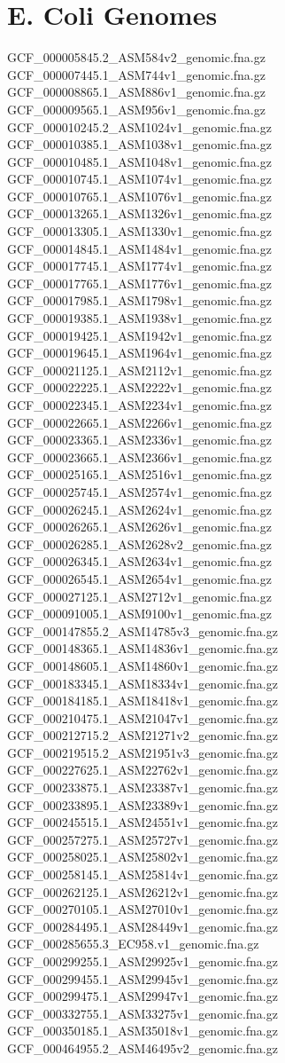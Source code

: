 \documentclass[12pt, letterpaper]{article}
\begin{document}
\section{E. Coli Genomes}
\begin{verbatim*}
GCF_000005845.2_ASM584v2_genomic.fna.gz
GCF_000007445.1_ASM744v1_genomic.fna.gz
GCF_000008865.1_ASM886v1_genomic.fna.gz
GCF_000009565.1_ASM956v1_genomic.fna.gz
GCF_000010245.2_ASM1024v1_genomic.fna.gz
GCF_000010385.1_ASM1038v1_genomic.fna.gz
GCF_000010485.1_ASM1048v1_genomic.fna.gz
GCF_000010745.1_ASM1074v1_genomic.fna.gz
GCF_000010765.1_ASM1076v1_genomic.fna.gz
GCF_000013265.1_ASM1326v1_genomic.fna.gz
GCF_000013305.1_ASM1330v1_genomic.fna.gz
GCF_000014845.1_ASM1484v1_genomic.fna.gz
GCF_000017745.1_ASM1774v1_genomic.fna.gz
GCF_000017765.1_ASM1776v1_genomic.fna.gz
GCF_000017985.1_ASM1798v1_genomic.fna.gz
GCF_000019385.1_ASM1938v1_genomic.fna.gz
GCF_000019425.1_ASM1942v1_genomic.fna.gz
GCF_000019645.1_ASM1964v1_genomic.fna.gz
GCF_000021125.1_ASM2112v1_genomic.fna.gz
GCF_000022225.1_ASM2222v1_genomic.fna.gz
GCF_000022345.1_ASM2234v1_genomic.fna.gz
GCF_000022665.1_ASM2266v1_genomic.fna.gz
GCF_000023365.1_ASM2336v1_genomic.fna.gz
GCF_000023665.1_ASM2366v1_genomic.fna.gz
GCF_000025165.1_ASM2516v1_genomic.fna.gz
GCF_000025745.1_ASM2574v1_genomic.fna.gz
GCF_000026245.1_ASM2624v1_genomic.fna.gz
GCF_000026265.1_ASM2626v1_genomic.fna.gz
GCF_000026285.1_ASM2628v2_genomic.fna.gz
GCF_000026345.1_ASM2634v1_genomic.fna.gz
GCF_000026545.1_ASM2654v1_genomic.fna.gz
GCF_000027125.1_ASM2712v1_genomic.fna.gz
GCF_000091005.1_ASM9100v1_genomic.fna.gz
GCF_000147855.2_ASM14785v3_genomic.fna.gz
GCF_000148365.1_ASM14836v1_genomic.fna.gz
GCF_000148605.1_ASM14860v1_genomic.fna.gz
GCF_000183345.1_ASM18334v1_genomic.fna.gz
GCF_000184185.1_ASM18418v1_genomic.fna.gz
GCF_000210475.1_ASM21047v1_genomic.fna.gz
GCF_000212715.2_ASM21271v2_genomic.fna.gz
GCF_000219515.2_ASM21951v3_genomic.fna.gz
GCF_000227625.1_ASM22762v1_genomic.fna.gz
GCF_000233875.1_ASM23387v1_genomic.fna.gz
GCF_000233895.1_ASM23389v1_genomic.fna.gz
GCF_000245515.1_ASM24551v1_genomic.fna.gz
GCF_000257275.1_ASM25727v1_genomic.fna.gz
GCF_000258025.1_ASM25802v1_genomic.fna.gz
GCF_000258145.1_ASM25814v1_genomic.fna.gz
GCF_000262125.1_ASM26212v1_genomic.fna.gz
GCF_000270105.1_ASM27010v1_genomic.fna.gz
GCF_000284495.1_ASM28449v1_genomic.fna.gz
GCF_000285655.3_EC958.v1_genomic.fna.gz
GCF_000299255.1_ASM29925v1_genomic.fna.gz
GCF_000299455.1_ASM29945v1_genomic.fna.gz
GCF_000299475.1_ASM29947v1_genomic.fna.gz
GCF_000332755.1_ASM33275v1_genomic.fna.gz
GCF_000350185.1_ASM35018v1_genomic.fna.gz
GCF_000464955.2_ASM46495v2_genomic.fna.gz

\end{verbatim*}
\end{document}
